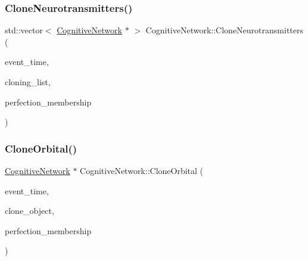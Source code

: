 \subsubsection{\texorpdfstring{Clone\+Neurotransmitters()}{CloneNeurotransmitters()}}
{\footnotesize\ttfamily std\+::vector$<$ \mbox{\hyperlink{classCognitiveNetwork}{Cognitive\+Network}} $\ast$ $>$ Cognitive\+Network\+::\+Clone\+Neurotransmitters (\begin{DoxyParamCaption}\item[{std\+::chrono\+::time\+\_\+point$<$ \mbox{\hyperlink{universe_8h_a0ef8d951d1ca5ab3cfaf7ab4c7a6fd80}{Clock}} $>$}]{event\+\_\+time,  }\item[{std\+::vector$<$ \mbox{\hyperlink{classCognitiveNetwork}{Cognitive\+Network}} $\ast$$>$}]{cloning\+\_\+list,  }\item[{double}]{perfection\+\_\+membership }\end{DoxyParamCaption})}

\mbox{\label{classCognitiveNetwork_aa8992740f25d46b0be3d9d8344c39f67}} 
\subsubsection{\texorpdfstring{Clone\+Orbital()}{CloneOrbital()}}
{\footnotesize\ttfamily \mbox{\hyperlink{classCognitiveNetwork}{Cognitive\+Network}} $\ast$ Cognitive\+Network\+::\+Clone\+Orbital (\begin{DoxyParamCaption}\item[{std\+::chrono\+::time\+\_\+point$<$ \mbox{\hyperlink{universe_8h_a0ef8d951d1ca5ab3cfaf7ab4c7a6fd80}{Clock}} $>$}]{event\+\_\+time,  }\item[{\mbox{\hyperlink{classCognitiveNetwork}{Cognitive\+Network}} $\ast$}]{clone\+\_\+object,  }\item[{double}]{perfection\+\_\+membership }\end{DoxyParamCaption})}

\mbox{\label{classCognitiveNetwork_a266b7baf2fd9d6b5c5652e251830020a}} 
